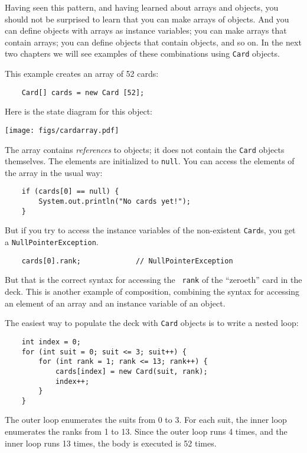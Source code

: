 \documentclass[12pt]{book}
\theoremstyle{definition}
\begin{document}
Having seen this pattern, and having learned about arrays and objects,
you should not be surprised to learn that you can make arrays of
objects.  And you can define objects with arrays as
instance variables; you can make arrays that contain arrays; you can
define objects that contain objects, and so on.
In the next two chapters we will see examples of these
combinations using {\tt Card} objects.

This example creates an array of 52 cards:

\begin{lstlisting}
    Card[] cards = new Card [52];
\end{lstlisting}

Here is the state diagram for this object:


\texttt{[image: figs/cardarray.pdf]}

The array contains
{\em references} to objects; it does not contain the
{\tt Card} objects themselves.  The elements are
initialized to {\tt null}.  You can access the elements of
the array in the usual way:

\begin{lstlisting}
    if (cards[0] == null) {
        System.out.println("No cards yet!");
    }
\end{lstlisting}
%
But if you try to access the instance variables of the
non-existent {\tt Card}s, you get a {\tt NullPointerException}.

\begin{lstlisting}
    cards[0].rank;             // NullPointerException
\end{lstlisting}
% 
But that is the correct syntax for accessing the {\tt
rank} of the ``zeroeth'' card in the deck.  This is another example of
  composition, combining the syntax for accessing an element
  of an array and an instance variable of an object.


The easiest way to populate the deck with {\tt Card} objects
is to write a nested loop:

\begin{lstlisting}
    int index = 0;
    for (int suit = 0; suit <= 3; suit++) {
        for (int rank = 1; rank <= 13; rank++) {
            cards[index] = new Card(suit, rank);
            index++;
        }
    }
\end{lstlisting}
%
The outer loop enumerates the suits from 0 to 3.  For
each suit, the inner loop enumerates the ranks from 1
to 13.  Since the outer loop runs 4 times, and
the inner loop runs 13 times,
the body is executed is 52 times.
\end{document}
